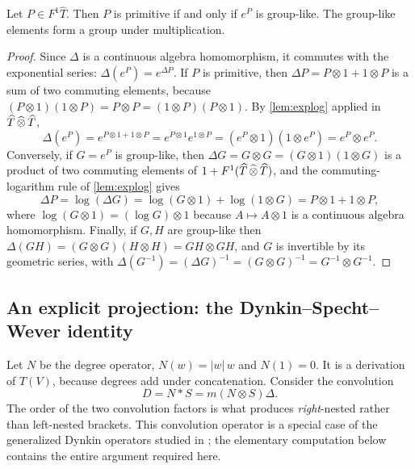 \begin{lemma}\label{lem:grouplike}
Let $P\in F^1\widehat T$. Then $P$ is primitive if and only if $e^P$ is
group-like. The group-like elements form a group under multiplication.
\end{lemma}
\begin{proof}
Since $\Delta$ is a continuous algebra homomorphism, it commutes with the
exponential series: $\Delta(e^P)=e^{\Delta P}$. If $P$ is primitive, then
$\Delta P=P\otimes1+1\otimes P$ is a sum of two commuting elements, because
$(P\otimes1)(1\otimes P)=P\otimes P=(1\otimes P)(P\otimes1)$. By
\cref{lem:explog} applied in $\widehat T\,\widehat{\otimes}\,\widehat T$,
\[
 \Delta(e^P)=e^{P\otimes1+1\otimes P}=e^{P\otimes1}e^{1\otimes P}
 =(e^P\otimes1)(1\otimes e^P)=e^P\otimes e^P.
\]
Conversely, if $G=e^P$ is group-like, then
$\Delta G=G\otimes G=(G\otimes1)(1\otimes G)$ is a product of two commuting
elements of $1+F^1(\widehat T\,\widehat{\otimes}\,\widehat T)$, and the commuting-logarithm
rule of \cref{lem:explog} gives
\[
 \Delta P=\log(\Delta G)=\log(G\otimes1)+\log(1\otimes G)
 =P\otimes1+1\otimes P,
\]
where $\log(G\otimes1)=(\log G)\otimes1$ because $A\mapsto A\otimes1$ is a
continuous algebra homomorphism. Finally, if $G,H$ are group-like then
$\Delta(GH)=(G\otimes G)(H\otimes H)=GH\otimes GH$, and $G$ is invertible by
its geometric series, with
$\Delta(G^{-1})=(\Delta G)^{-1}=(G\otimes G)^{-1}=G^{-1}\otimes G^{-1}$.
\end{proof}

\subsection{An explicit projection: the Dynkin--Specht--Wever identity}
Let $N$ be the degree operator, $N(w)=|w|\,w$ and $N(1)=0$. It is a
derivation of $T(V)$, because degrees add under concatenation. Consider the
convolution
\begin{equation}\label{eq:dynkinoperator}
 D=N*S=m(N\otimes S)\Delta.
\end{equation}
The order of the two convolution factors is what produces
\emph{right}-nested rather than left-nested brackets. This convolution
operator is a special case of the generalized Dynkin operators studied in
\cite{menouspatras}; the elementary computation below contains the entire
argument required here.


